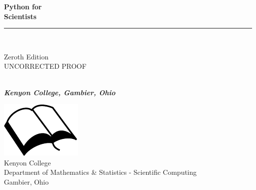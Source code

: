 \documentclass{book}
\makeatletter
\newcommand{\bookprinttitle}{Python for\\Scientists}
\newcommand{\booksubtitle}{Introduction to Python for Scientific Computing}
\newcommand{\authorsubtitle}{Kenyon College, Gambier, Ohio}
\newcommand{\bookauthor}{\@author}
\makeatother
\begin{document}
\restoregeometry
\setcounter{page}{1}
\renewcommand{\thepage}{Inside Cover \arabic{page}}

\thispagestyle{empty}
\setcounter{page}{1}
\renewcommand{\thepage}{Title Page \arabic{page}}

\begin{titlepage}
\begin{flushleft}

\textbf{\fontsize{48}{54}\selectfont \bookprinttitle}

\par\noindent\rule{\textwidth}{4pt}\\


\begin{flushright}
\Large Zeroth Edition\\UNCORRECTED PROOF
\end{flushright}

\vspace{\fill}

\textbf{\large \bookauthor}\\[3.5pt]
\textbf{\large \textit{\authorsubtitle}}

\vspace{\fill}

\begin{center}
\includegraphics{img/booksvg.pdf}\\[4pt]
\small{Kenyon College\\
Department of Mathematics \& Statistics - Scientific Computing\\
Gambier, Ohio}
\end{center}

\end{flushleft}
\end{titlepage}
\restoregeometry
\end{document}
